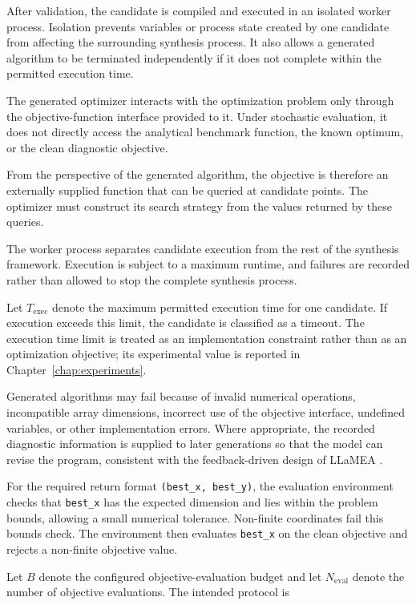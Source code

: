 After validation, the candidate is compiled and executed in an isolated
worker process. Isolation prevents variables or process state created by one
candidate from affecting the surrounding synthesis process. It also allows a
generated algorithm to be terminated independently if it does not complete
within the permitted execution time.

The generated optimizer interacts with the optimization problem only through
the objective-function interface provided to it. Under stochastic evaluation,
it does not directly access the analytical benchmark function, the known
optimum, or the clean diagnostic objective.

From the perspective of the generated algorithm, the objective is therefore
an externally supplied function that can be queried at candidate points. The
optimizer must construct its search strategy from the values returned by these
queries.

The worker process separates candidate execution from the rest of the synthesis framework. Execution is subject to a maximum runtime, and failures are recorded rather than allowed to stop the complete synthesis process.

Let $T_{\mathrm{exec}}$ denote the maximum permitted execution time for one candidate. If execution exceeds this limit, the candidate is classified as a timeout. The execution time limit is treated as an implementation constraint rather than as an optimization objective; its experimental value is reported in Chapter~\ref{chap:experiments}.

Generated algorithms may fail because of invalid numerical operations, incompatible array dimensions, incorrect use of the objective interface, undefined variables, or other implementation errors. Where appropriate, the recorded diagnostic information is supplied to later generations so that the model can revise the program, consistent with the feedback-driven design of LLaMEA \cite{LLaMEA2024}.

For the required return format \texttt{(best\_x, best\_y)}, the evaluation environment checks that \texttt{best\_x} has the expected dimension and lies within the problem bounds, allowing a small numerical tolerance. Non-finite coordinates fail this bounds check. The environment then evaluates \texttt{best\_x} on the clean objective and rejects a non-finite objective value.

Let $B$ denote the configured objective-evaluation budget and let $N_{\mathrm{eval}}$ denote the number of objective evaluations. The intended protocol is

